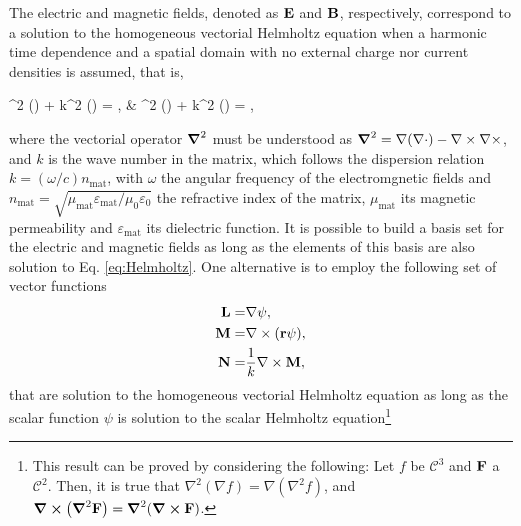 
The electric and magnetic fields, denoted as $\vb{E}$ and $\vb{B}$, respectively, correspond to a solution to the homogeneous vectorial Helmholtz equation when a harmonic time dependence and a spatial domain with no external charge nor current densities is assumed, that is,
%
\begin{tcolorbox}[title = Vectorial Helmholtz Equation,	ams align, breakable]
	\grad^2 () + k^2 () = ,
		\qquad&\qquad
  	\grad^2 () + k^2 () = ,
  	\label{eq:Helmholtz}
\end{tcolorbox}
%
\noindent where the vectorial operator $\grad^2$ must be understood as $\grad^2 = \nabla(\nabla\cdot) - \nabla\times\nabla\times $, and $k$ is the wave number in the matrix, which follows the dispersion relation $k = (\omega/c) n_\text{mat}$, with $\omega$ the angular frequency of the electromgnetic fields and $n_\text{mat}=\sqrt{\mu_\text{mat}\varepsilon_\text{mat} /\mu_0\varepsilon_0}$ the refractive index of the matrix, $\mu_\text{mat}$ its magnetic permeability and $\varepsilon_\text{mat}$ its dielectric function. It is possible to build a basis set for the electric and magnetic fields as long as the elements of this basis are also solution to Eq. \eqref{eq:Helmholtz}. One alternative is to employ the following set of vector functions \cite{stratton_electromagnetic_2012}
%
\begin{subequations}
\begin{align}
	\vb{L} =& \nabla \psi,
	\label{eq:L}\\
	\vb{M} =& \nabla\times(\vb{r}\psi),
	\label{eq:M}\\
	\vb{N} =&  \frac{1}{k}\nabla\times\vb{M},
	\label{eq:N}
\end{align}%
\label{eq:VSH}%
\end{subequations}
%
that are solution to the homogeneous vectorial Helmholtz equation as long as the scalar function $\psi$ is solution to the scalar Helmholtz equation\footnote{%
	This result can be proved by considering the following: Let $f$ be $\mathcal{C}^3$ and $\vb{F}$ a $\mathcal{C}^2$. Then, it is true that $\nabla^2(\nabla f) = \nabla(\nabla^2 f)$, and $\curl(\grad^2\vb{F}) = \grad^2(\curl\vb{F})$. }%
